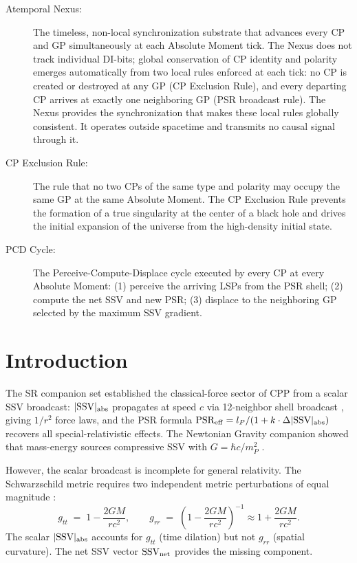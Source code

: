 \documentclass[12pt]{article}
\newcommand{\lP}{l_P}
\newcommand{\mP}{m_P}
\newcommand{\SSV}{\text{SSV}}
\newcommand{\PSR}{\text{PSR}}
\begin{document}
\begin{description}
\item[Atemporal Nexus:] The timeless, non-local synchronization
  substrate that advances every CP and GP simultaneously at each
  Absolute Moment tick. The Nexus does not track individual
  DI-bits; global conservation of CP identity and polarity emerges
  automatically from two local rules enforced at each tick: no CP
  is created or destroyed at any GP (CP Exclusion Rule), and every
  departing CP arrives at exactly one neighboring GP (PSR broadcast
  rule). The Nexus provides the synchronization that makes these
  local rules globally consistent. It operates outside spacetime
  and transmits no causal signal through it.

\item[CP Exclusion Rule:] The rule that no two CPs of the same type
  and polarity may occupy the same GP at the same Absolute Moment.
  The CP Exclusion Rule prevents the formation of a true singularity
  at the center of a black hole and drives the initial expansion of
  the universe from the high-density initial state.

\item[PCD Cycle:] The Perceive-Compute-Displace cycle executed by
  every CP at every Absolute Moment: (1) perceive the arriving LSPs
  from the PSR shell; (2) compute the net SSV and new PSR; (3)
  displace to the neighboring GP selected by the maximum SSV
  gradient.

\end{description}


\section{Introduction}
\label{sec:intro}

The SR companion set \citep{abshier2026sr} established the classical-force
sector of CPP from a scalar SSV broadcast: $|\SSV|_{\rm abs}$ propagates
at speed $c$ via 12-neighbor shell broadcast \citep{abshier2026stiff},
giving $1/r^2$ force laws, and the PSR formula
$\PSR_{\rm eff} = \lP/(1+k\cdot\Delta|\SSV|_{\rm abs})$
recovers all special-relativistic effects.  The Newtonian Gravity companion
showed that mass-energy sources compressive SSV with
$G = \hbar c/\mP^2$ \citep{abshier2026grav}.

However, the scalar broadcast is incomplete for general relativity.  The
Schwarzschild metric requires two independent metric perturbations of
equal magnitude \citep{einstein1915}:
\begin{equation}
  g_{tt} \;=\; 1 - \frac{2GM}{rc^2},
  \qquad
  g_{rr} \;=\; \left(1 - \frac{2GM}{rc^2}\right)^{-1}
  \approx 1 + \frac{2GM}{rc^2}.
  \label{eq:Schwarzschild_weak}
\end{equation}
The scalar $|\SSV|_{\rm abs}$ accounts for $g_{tt}$ (time dilation)
but not $g_{rr}$ (spatial curvature).  The net SSV vector
$\mathbf{\SSV}_{\rm net}$ provides the missing component.
\end{document}
